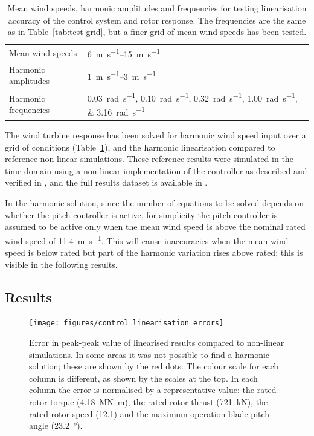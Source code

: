 \documentclass[a4paper,preprint]{elsarticle}
\begin{document}
\begin{table}
  \centering
  \caption{Mean wind speeds, harmonic amplitudes and frequencies for testing
    linearisation accuracy of the control system and rotor response. The
    frequencies are the same as in Table~\ref{tab:test-grid}, but a finer grid
    of mean wind speeds has been tested.}
  \label{tab:test-grid-2}
  \begin{tabular}{ll}
    \toprule
    Mean wind speeds & \SIrange{6}{15}{\meter\per\second} \\
    Harmonic amplitudes & \SIrange{1}{3}{\meter\per\second} \\
    Harmonic frequencies & \SIlist{0.03;0.10;0.32;1.00;3.16}{\radian\per\second} \\
    \bottomrule
  \end{tabular}
\end{table}

The wind turbine response has been solved for harmonic wind speed input over a
grid of conditions (Table~\ref{tab:test-grid-2}), and the harmonic linearisation
compared to reference non-linear simulations. These reference results were
simulated in the time domain using a non-linear implementation of the controller
as described and verified in \citet{lupton_frequencydomain_2015}, and the full
results dataset is available in \cite{lupton_2018_1484513}.

In the harmonic solution, since the number of equations to be solved depends on
whether the pitch controller is active, for simplicity the pitch controller is
assumed to be active only when the mean wind speed is above the nominal rated
wind speed of \SI{11.4}{\metre\per\second}. This will cause inaccuracies when
the mean wind speed is below rated but part of the harmonic variation rises
above rated; this is visible in the following results.

\subsection{Results}
\label{sec:control-results}

\begin{figure}
  \centering
  \hspace*{-0.5cm}\texttt{[image: figures/control\_linearisation\_errors]}
  \caption{Error in peak-peak value of linearised results compared to
    non-linear simulations. In some areas it was not possible to find a
    harmonic solution; these are shown by the red dots. The colour
    scale for each column is different, as shown by the scales at the
    top. In each column the error is normalised by a representative
    value: the rated rotor torque (\SI{4.18}{\mega\newton\metre}), the
    rated rotor thrust (\SI{721}{\kilo\newton}), the rated rotor speed
    (\SI{12.1}{\rpm}) and the maximum operation blade pitch angle
    (\SI{23.2}{\degree}).}
  \label{fig:control-lin-errors}
\end{figure}
\end{document}
